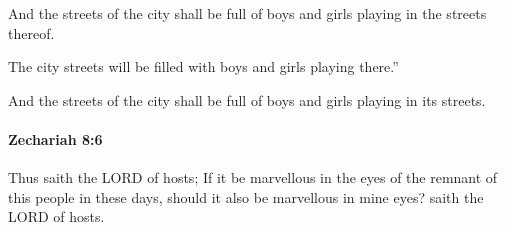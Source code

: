 			\begin{versebox}
					\item[BHS] 
					\item[LXX] 
					\item[ASV] And the streets of the city shall be full of boys and girls playing in the streets thereof.
					\item[NIV] The city streets will be filled with boys and girls playing there.”
					\item[NRSV] And the streets of the city shall be full of boys and girls playing in its streets.
			\end{versebox}

		\paragraph{Zechariah 8:6} %
			\label{ZECHARIAH-8-6}

			Thus saith the LORD of hosts; If it be marvellous in the eyes of the remnant of this people in these days, should it also be marvellous in mine eyes? saith the LORD of hosts.

